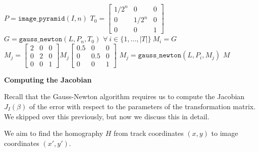 \documentclass[float=false, crop=false]{standalone}
\begin{document}
	\begin{algorithmic}
		\STATE $P = \texttt{image\_pyramid}(I, n)$
		\STATE $T_0 = \left[\begin{array}{ccc}1/2^n&0&0\\0&1/2^n&0\\0&0&1\end{array}\right]$
		\STATE $G = \texttt{gauss\_newton}(L, P_{n}, T_0)$
		\STATE $\forall~i\in\{1,\ldots,|T|\}~M_i = G$
			\STATE $M_j = \left[\begin{array}{ccc}2&0&0\\0&2&0\\0&0&1\end{array}\right] M_j
				\left[\begin{array}{ccc}0.5&0&0\\0&0.5&0\\0&0&1\end{array}\right]$
			\STATE $M_j = \texttt{gauss\_newton}(L, P_{i}, M_j)$
			\ENDFOR
		\ENDFOR
		\RETURN $M$
	\end{algorithmic}
	\label{alg:coregister}

{\bf Computing the Jacobian}

Recall that the Gauss-Newton algorithm requires us to compute the Jacobian $J_I(\beta)$ of the error
with respect to the parameters of the transformation matrix. We skipped over this
previously, but now we discuss this in detail.

We aim to find the homography $H$ from track coordinates $(x, y)$ to image coordinates $(x', y')$.
\end{document}
